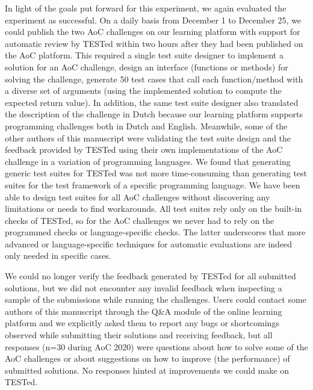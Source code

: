 \documentclass[../main]{subfiles}
\begin{document}
In light of the goals put forward for this experiment, we again evaluated the experiment as successful.
On a daily basis from December 1 to December 25, we could publish the two AoC challenges on our learning platform with support for automatic review by TESTed within two hours after they had been published on the AoC platform.
This required a single test suite designer to implement a solution for an AoC challenge, design an interface (functions or methods) for solving the challenge, generate 50 test cases that call each function/method with a diverse set of arguments (using the implemented solution to compute the expected return value).
In addition, the same test suite designer also translated the description of the challenge in Dutch because our learning platform supports programming challenges both in Dutch and English.
Meanwhile, some of the other authors of this manuscript were validating the test suite design and the feedback provided by TESTed using their own implementations of the AoC challenge in a variation of programming languages.
We found that generating generic test suites for TESTed was not more time-consuming than generating test suites for the test framework of a specific programming language.
We have been able to design test suites for all AoC challenges without discovering any limitations or needs to find workarounds.
All test suites rely only on the built-in checks of TESTed, so for the AoC challenges we never had to rely on the programmed checks or language-specific checks.
The latter underscores that more advanced or language-specific techniques for automatic evaluations are indeed only needed in specific cases.

We could no longer verify the feedback generated by TESTed for all submitted solutions, but we did not encounter any invalid feedback when inspecting a sample of the submissions while running the challenges.
Users could contact some authors of this manuscript through the Q\&A module of the online learning platform and we explicitly asked them to report any bugs or shortcomings observed while submitting their solutions and receiving feedback, but all responses (n=30 during AoC 2020) were questions about how to solve some of the AoC challenges or about suggestions on how to improve (the performance) of submitted solutions.
No responses hinted at improvements we could make on TESTed.
\end{document}
